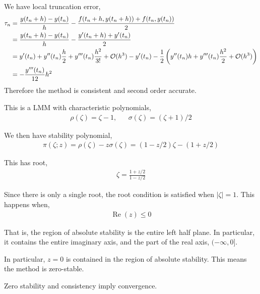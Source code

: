 \documentclass[10pt]{article}
\begin{document}
\begin{solution}
    We have local truncation error,
    \begin{align*}
        \tau_n &= \frac{y(t_n + h) - y(t_n)}{h} - \frac{f(t_n+h,y(t_n+h))+f(t_n,y(t_n))}{2} 
        \\&= \frac{y(t_n+h) - y(t_n)}{h} - \frac{y'(t_n+h)+y'(t_n)}{2}
        \\&= y'(t_n) + y''(t_n)\frac{h}{2} + y'''(t_n)\frac{h^2}{3!} + \mathcal{O}(h^3) - y'(t_n) - \frac{1}{2} \left( y''(t_n) h + y'''(t_n) \frac{h^2}{2} + \mathcal{O}(h^3) \right)
        \\&= -\frac{y'''(t_n)}{12} h^2
    \end{align*}
    Therefore the method is consistent and second order accurate.

    This is a LMM with characteristic polynomials,
    \begin{align*}
        \rho(\zeta) = \zeta-1, && \sigma(\zeta) = (\zeta + 1)/2
    \end{align*}

    We then have stability polynomial,
    \begin{align*}
        \pi(\zeta;z) = \rho(\zeta) - z\sigma(\zeta) =  \left(1- z/2 \right) \zeta - (1+z/2)
    \end{align*}
    
    This has root,
    \begin{align*}
        \zeta = \frac{1+z/2}{1-z/2}
    \end{align*}

    Since there is only a single root, the root condition is satisfied when \( |\zeta| = 1 \). This happens when,
    \begin{align*}
        \operatorname{Re}(z) \leq 0
    \end{align*}
   
    That is, the region of absolute stability is the entire left half plane. In particular, it contains the entire imaginary axis, and the part of the real axis, \( (-\infty, 0] \).

    In particular, \( z=0 \) is contained in the region of absolute stability. This means the method is zero-stable.

    Zero stability and consistency imply convergence.    
\end{solution}
\end{document}
